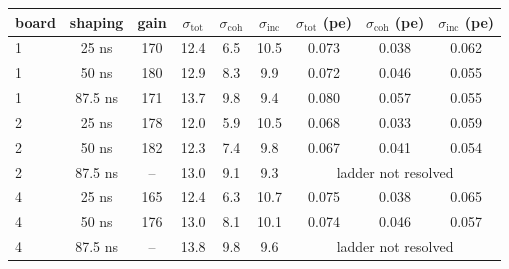 \begin{tabular}{lcccccccc}
\toprule
board & shaping & gain & $\sigma_\mathrm{tot}$ & $\sigma_\mathrm{coh}$ & $\sigma_\mathrm{inc}$ & $\sigma_\mathrm{tot}$ (pe) & $\sigma_\mathrm{coh}$ (pe) & $\sigma_\mathrm{inc}$ (pe) \\
\midrule
1 & 25 ns & 170 & 12.4 & 6.5 & 10.5 & 0.073 & 0.038 & 0.062 \\
1 & 50 ns & 180 & 12.9 & 8.3 & 9.9 & 0.072 & 0.046 & 0.055 \\
1 & 87.5 ns & 171 & 13.7 & 9.8 & 9.4 & 0.080 & 0.057 & 0.055 \\
\midrule
2 & 25 ns & 178 & 12.0 & 5.9 & 10.5 & 0.068 & 0.033 & 0.059 \\
2 & 50 ns & 182 & 12.3 & 7.4 & 9.8 & 0.067 & 0.041 & 0.054 \\
2 & 87.5 ns & -- & 13.0 & 9.1 & 9.3 & \multicolumn{3}{c}{ladder not resolved} \\
\midrule
4 & 25 ns & 165 & 12.4 & 6.3 & 10.7 & 0.075 & 0.038 & 0.065 \\
4 & 50 ns & 176 & 13.0 & 8.1 & 10.1 & 0.074 & 0.046 & 0.057 \\
4 & 87.5 ns & -- & 13.8 & 9.8 & 9.6 & \multicolumn{3}{c}{ladder not resolved} \\
\bottomrule
\end{tabular}
